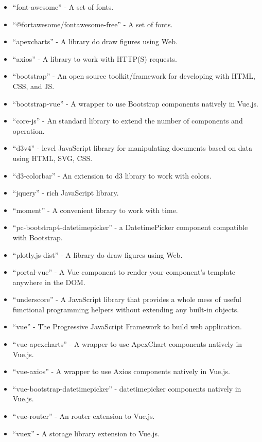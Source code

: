 \begin{itemize}
\tightlist
\item
  ``font-awesome'' - A set of fonts.
\item
  ``@fortawesome/fontawesome-free'' - A set of fonts.
\item
  ``apexcharts'' - A library do draw figures using Web.
\item
  ``axios'' - A library to work with HTTP(S) requests.
\item
  ``bootstrap'' - An open source toolkit/framework for developing with
  HTML, CSS, and JS.
\item
  ``bootstrap-vue'' - A wrapper to use Bootstrap components natively in
  Vue.js.
\item
  ``core-js'' - An standard library to extend the number of components
  and operation.
\item
  ``d3v4'' - level JavaScript library for manipulating documents based
  on data using HTML, SVG, CSS.
\item
  ``d3-colorbar'' - An extension to d3 library to work with colors.
\item
  ``jquery'' - rich JavaScript library.
\item
  ``moment'' - A convenient library to work with time.
\item
  ``pc-bootstrap4-datetimepicker'' - a DatetimePicker component
  compatible with Bootstrap.
\item
  ``plotly.js-dist'' - A library do draw figures using Web.
\item
  ``portal-vue'' - A Vue component to render your component's template
  anywhere in the DOM.
\item
  ``underscore'' - A JavaScript library that provides a whole mess of
  useful functional programming helpers without extending any built-in
  objects.
\item
  ``vue'' - The Progressive JavaScript Framework to build web
  application.
\item
  ``vue-apexcharts'' - A wrapper to use ApexChart components natively in
  Vue.js.
\item
  ``vue-axios'' - A wrapper to use Axios components natively in Vue.js.
\item
  ``vue-bootstrap-datetimepicker'' - datetimepicker components natively
  in Vue.js.
\item
  ``vue-router'' - An router extension to Vue.js.
\item
  ``vuex'' - A storage library extension to Vue.js.
\end{itemize}

